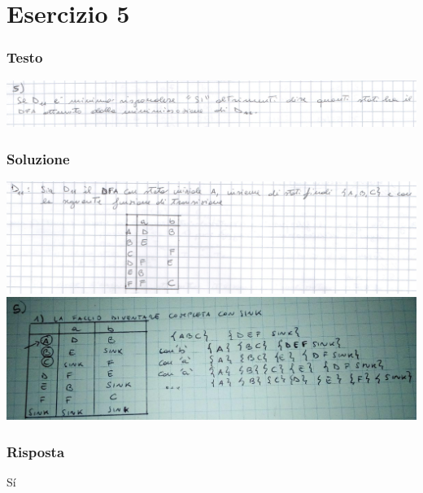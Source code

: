 \chapter{Esercizio 5}

\subsection{Testo}

\begin{center}
    \includegraphics[scale=0.2]{Chapters/Img/05text.png}\\
\end{center} 

\subsection{Soluzione}

\begin{center}
    \includegraphics[scale=0.2]{Chapters/Img/d11.png}\\
    \includegraphics[scale=0.5]{Chapters/Img/05solution.png}\\
\end{center} 

\subsection{Risposta}
S\'i